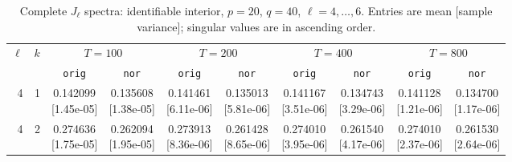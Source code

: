 \documentclass[12pt,letterpaper]{article}
\def\spacingset#1{\renewcommand{\baselinestretch}{#1}\small\normalsize}
\theoremstyle{plain}
\theoremstyle{definition}
\begin{document}
\clearpage
\begin{table}[p]
\begingroup
\spacingset{1.0}
\small\centering
\caption{Complete $J_\ell$ spectra: identifiable interior, $p=20$, $q=40$, $\ell=4,\ldots,6$. Entries are mean [sample variance]; singular values are in ascending order.}
\label{s23:lambda:alltab:spectra:p20q40interior:4-6}
\footnotesize
\setlength{\tabcolsep}{2.2pt}
\renewcommand{\arraystretch}{1.03}
\begin{adjustbox}{max width=\linewidth}
\begin{tabular}{@{}rr*{8}{c}@{}}
\toprule
$\ell$ & $k$ & \multicolumn{2}{c}{$T=100$} & \multicolumn{2}{c}{$T=200$} & \multicolumn{2}{c}{$T=400$} & \multicolumn{2}{c}{$T=800$}\\
\cmidrule(lr){3-4}\cmidrule(lr){5-6}\cmidrule(lr){7-8}\cmidrule(lr){9-10}
 &  & \texttt{orig} & \texttt{nor} & \texttt{orig} & \texttt{nor} & \texttt{orig} & \texttt{nor} & \texttt{orig} & \texttt{nor}\\
\midrule
4 & 1 & \shortstack{0.142099\\[-1pt]{\scriptsize[1.45e-05]}} & \shortstack{0.135608\\[-1pt]{\scriptsize[1.38e-05]}} & \shortstack{0.141461\\[-1pt]{\scriptsize[6.11e-06]}} & \shortstack{0.135013\\[-1pt]{\scriptsize[5.81e-06]}} & \shortstack{0.141167\\[-1pt]{\scriptsize[3.51e-06]}} & \shortstack{0.134743\\[-1pt]{\scriptsize[3.29e-06]}} & \shortstack{0.141128\\[-1pt]{\scriptsize[1.21e-06]}} & \shortstack{0.134700\\[-1pt]{\scriptsize[1.17e-06]}}\\
4 & 2 & \shortstack{0.274636\\[-1pt]{\scriptsize[1.75e-05]}} & \shortstack{0.262094\\[-1pt]{\scriptsize[1.95e-05]}} & \shortstack{0.273913\\[-1pt]{\scriptsize[8.36e-06]}} & \shortstack{0.261428\\[-1pt]{\scriptsize[8.65e-06]}} & \shortstack{0.274010\\[-1pt]{\scriptsize[3.95e-06]}} & \shortstack{0.261540\\[-1pt]{\scriptsize[4.17e-06]}} & \shortstack{0.274010\\[-1pt]{\scriptsize[2.37e-06]}} & \shortstack{0.261530\\[-1pt]{\scriptsize[2.64e-06]}}\\

\end{tabular}
\end{adjustbox}
\end{table}
\end{document}
